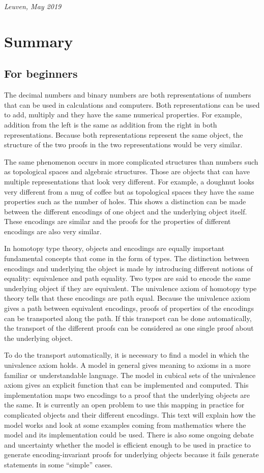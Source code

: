 \documentclass[12pt,a4paper,twoside,xetex]{book} %
\begin{document}
\mbox{}\hfill \textit{Leuven, May 2019}

\chapter*{Summary}

\section*{For beginners}

The decimal numbers and binary numbers are both representations of numbers that can be used in calculations and computers. Both representations can be used to add, multiply and they have the same numerical properties. For example, addition from the left is the same as addition from the right in both representations. Because both representations  represent the same object, the structure of the two proofs in the two representations would be very similar.  

The same phenomenon occurs in more complicated structures than numbers such as topological spaces and algebraic structures. Those are objects that can have multiple representations that look very different. For example, a doughnut looks very different from a mug of coffee but as topological spaces they have the same properties such as the number of holes. This shows a distinction can be made between the different encodings of one object and the underlying object itself. These encodings are similar and the proofs for the properties of different encodings are also very similar.

In homotopy type theory, objects and encodings are equally important fundamental concepts that come in the form of types. The distinction between encodings and underlying the object is made by introducing  different notions of equality: equivalence and path equality. Two types are said to encode the same underlying object if they are equivalent. The univalence axiom of homotopy type theory tells that these encodings are path equal. Because the univalence axiom gives a path between equivalent encodings, proofs of properties of the encodings can be transported along the path. If this transport can be done automatically, the transport of the different proofs can be considered as one single proof about the underlying object. 

To do the transport automatically, it is necessary to find a model in which the univalence axiom holds. A model in general gives meaning to axioms in a more familiar or understandable language. The model in cubical sets of the univalence axiom gives an explicit function that can be implemented and computed. This implementation maps two encodings to a proof that the underlying objects are the same. It is currently an open problem to use this mapping in practice for complicated objects and their different encodings. This text will explain how the model works and look at some examples coming from mathematics where the model and its implementation could be used. There is also some ongoing debate and uncertainty whether the model is efficient enough to be used in practice to generate encoding-invariant proofs for underlying objects because it fails generate statements in some ``simple'' cases.
\end{document}
